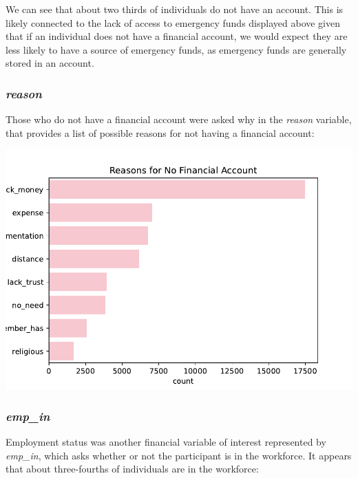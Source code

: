 \documentclass[water,article,submit,moreauthors,pdftex]{mdpi}
\begin{document}
We can see that about two thirds of individuals do not have an account.
This is likely connected to the lack of access to emergency funds
displayed above given that if an individual does not have a financial
account, we would expect they are less likely to have a source of
emergency funds, as emergency funds are generally stored in an account.

\hypertarget{reason}{%
\subsubsection{\texorpdfstring{\emph{reason}}{reason}}\label{reason}}

Those who do not have a financial account were asked why in the
\emph{reason} variable, that provides a list of possible reasons for not
having a financial account:

\includegraphics{term_paper_files/figure-latex/unnamed-chunk-11-7.pdf}

\hypertarget{emp_in}{%
\subsubsection{\texorpdfstring{\emph{emp\_in}}{emp\_in}}\label{emp_in}}

Employment status was another financial variable of interest represented
by \emph{emp\_in}, which asks whether or not the participant is in the
workforce. It appears that about three-fourths of individuals are in the
workforce:
\end{document}
